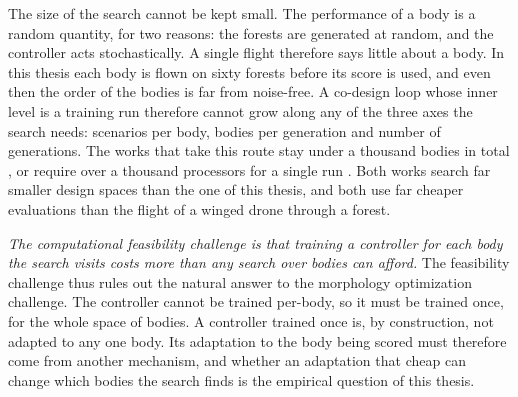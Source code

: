 The size of the search cannot be kept small. The performance of a body is a random quantity, for two reasons: the forests are generated at random, and the controller acts stochastically. A single flight therefore says little about a body. In this thesis each body is flown on sixty forests before its score is used, and even then the order of the bodies is far from noise-free. A co-design loop whose inner level is a training run therefore cannot grow along any of the three axes the search needs: scenarios per body, bodies per generation and number of generations. The works that take this route stay under a thousand bodies in total \cite{muff2026hexacopters}, or require over a thousand processors for a single run \cite{gupta2021embodied}. Both works search far smaller design spaces than the one of this thesis, and both use far cheaper evaluations than the flight of a winged drone through a forest.

\emph{The computational feasibility challenge is that training a controller for each body the search visits costs more than any search over bodies can afford.} The feasibility challenge thus rules out the natural answer to the morphology optimization challenge. The controller cannot be trained per-body, so it must be trained once, for the whole space of bodies. A controller trained once is, by construction, not adapted to any one body. Its adaptation to the body being scored must therefore come from another mechanism, and whether an adaptation that cheap can change which bodies the search finds is the empirical question of this thesis.
